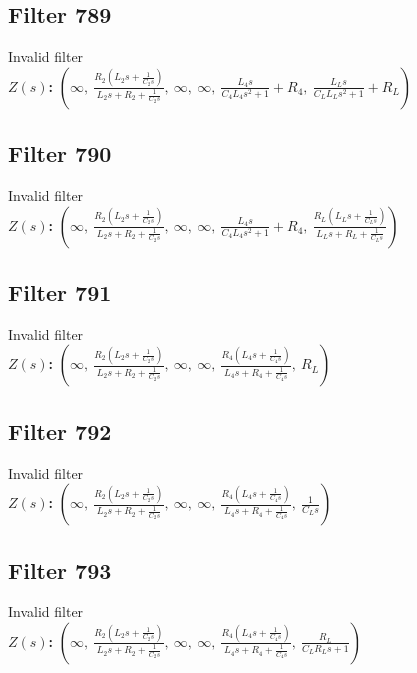 \documentclass{article}
\begin{document}
\subsection*{Filter 789}
Invalid filter \\ 
\textbf{$Z(s)$:} $\left( \infty, \  \frac{R_{2} \left(L_{2} s + \frac{1}{C_{2} s}\right)}{L_{2} s + R_{2} + \frac{1}{C_{2} s}}, \  \infty, \  \infty, \  \frac{L_{4} s}{C_{4} L_{4} s^{2} + 1} + R_{4}, \  \frac{L_{L} s}{C_{L} L_{L} s^{2} + 1} + R_{L}\right)$ \\ 
\subsection*{Filter 790}
Invalid filter \\ 
\textbf{$Z(s)$:} $\left( \infty, \  \frac{R_{2} \left(L_{2} s + \frac{1}{C_{2} s}\right)}{L_{2} s + R_{2} + \frac{1}{C_{2} s}}, \  \infty, \  \infty, \  \frac{L_{4} s}{C_{4} L_{4} s^{2} + 1} + R_{4}, \  \frac{R_{L} \left(L_{L} s + \frac{1}{C_{L} s}\right)}{L_{L} s + R_{L} + \frac{1}{C_{L} s}}\right)$ \\ 
\subsection*{Filter 791}
Invalid filter \\ 
\textbf{$Z(s)$:} $\left( \infty, \  \frac{R_{2} \left(L_{2} s + \frac{1}{C_{2} s}\right)}{L_{2} s + R_{2} + \frac{1}{C_{2} s}}, \  \infty, \  \infty, \  \frac{R_{4} \left(L_{4} s + \frac{1}{C_{4} s}\right)}{L_{4} s + R_{4} + \frac{1}{C_{4} s}}, \  R_{L}\right)$ \\ 
\subsection*{Filter 792}
Invalid filter \\ 
\textbf{$Z(s)$:} $\left( \infty, \  \frac{R_{2} \left(L_{2} s + \frac{1}{C_{2} s}\right)}{L_{2} s + R_{2} + \frac{1}{C_{2} s}}, \  \infty, \  \infty, \  \frac{R_{4} \left(L_{4} s + \frac{1}{C_{4} s}\right)}{L_{4} s + R_{4} + \frac{1}{C_{4} s}}, \  \frac{1}{C_{L} s}\right)$ \\ 
\subsection*{Filter 793}
Invalid filter \\ 
\textbf{$Z(s)$:} $\left( \infty, \  \frac{R_{2} \left(L_{2} s + \frac{1}{C_{2} s}\right)}{L_{2} s + R_{2} + \frac{1}{C_{2} s}}, \  \infty, \  \infty, \  \frac{R_{4} \left(L_{4} s + \frac{1}{C_{4} s}\right)}{L_{4} s + R_{4} + \frac{1}{C_{4} s}}, \  \frac{R_{L}}{C_{L} R_{L} s + 1}\right)$ \\ 
\end{document}
